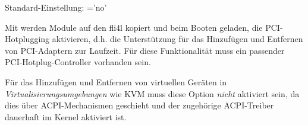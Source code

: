   Standard-Einstellung: ='no'


  Mit  werden Module auf den fli4l kopiert und
  beim Booten geladen, die PCI-Hotplugging aktivieren, d.h. die Unterstützung
  für das Hinzufügen und Entfernen von PCI-Adaptern zur Laufzeit. Für diese
  Funktionalität muss ein passender PCI-Hotplug-Controller vorhanden sein.

  Für das Hinzufügen und Entfernen von virtuellen Geräten in
  \emph{Virtualisierungsumgebungen} wie KVM muss diese Option \emph{nicht}
  aktiviert sein, da dies über ACPI-Mechanismen geschieht und der zugehörige
  ACPI-Treiber dauerhaft im Kernel aktiviert ist.
